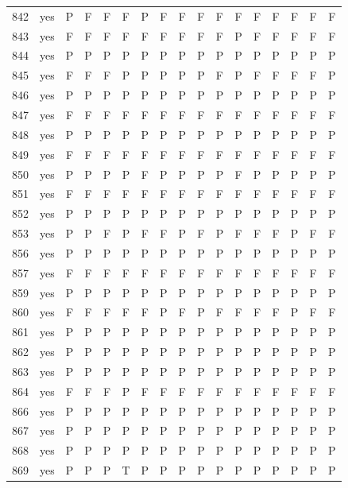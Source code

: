 \begin{table}[p]
\begin{tabular*}{\textwidth}{@{\extracolsep{\fill}}rcccccccccccccccc}
842 & yes & P & F & F & F & P & F & F & F & F & F & F & F & F & F & F\\
843 & yes & F & F & F & F & F & F & F & F & F & P & F & F & F & F & F\\
844 & yes & P & P & P & P & P & P & P & P & P & P & P & P & P & P & P\\
845 & yes & F & F & F & P & P & P & P & P & F & P & F & F & F & F & P\\
846 & yes & P & P & P & P & P & P & P & P & P & P & P & P & P & P & P\\
847 & yes & F & F & F & F & F & F & F & F & F & F & F & F & F & F & F\\
848 & yes & P & P & P & P & P & P & P & P & P & P & P & P & P & P & P\\
849 & yes & F & F & F & F & F & F & F & F & F & F & F & F & F & F & F\\
850 & yes & P & P & P & P & F & P & P & P & P & F & P & P & P & P & P\\
851 & yes & F & F & F & F & F & F & F & F & F & F & F & F & F & F & F\\
852 & yes & P & P & P & P & P & P & P & P & P & P & P & P & P & P & P\\
853 & yes & P & P & F & P & F & F & P & F & P & F & F & F & P & F & F\\
856 & yes & P & P & P & P & P & P & P & P & P & P & P & P & P & P & P\\
857 & yes & F & F & F & F & F & F & F & F & F & F & F & F & F & F & F\\
859 & yes & P & P & P & P & P & P & P & P & P & P & P & P & P & P & P\\
860 & yes & F & F & F & F & F & P & F & P & F & F & F & F & P & F & F\\
861 & yes & P & P & P & P & P & P & P & P & P & P & P & P & P & P & P\\
862 & yes & P & P & P & P & P & P & P & P & P & P & P & P & P & P & P\\
863 & yes & P & P & P & P & P & P & P & P & P & P & P & P & P & P & P\\
864 & yes & F & F & F & P & F & F & F & F & F & F & F & F & F & F & F\\
866 & yes & P & P & P & P & P & P & P & P & P & P & P & P & P & P & P\\
867 & yes & P & P & P & P & P & P & P & P & P & P & P & P & P & P & P\\
868 & yes & P & P & P & P & P & P & P & P & P & P & P & P & P & P & P\\
869 & yes & P & P & P & T & P & P & P & P & P & P & P & P & P & P & P\\
\bottomrule\end{tabular*}\end{table}
\clearpage

